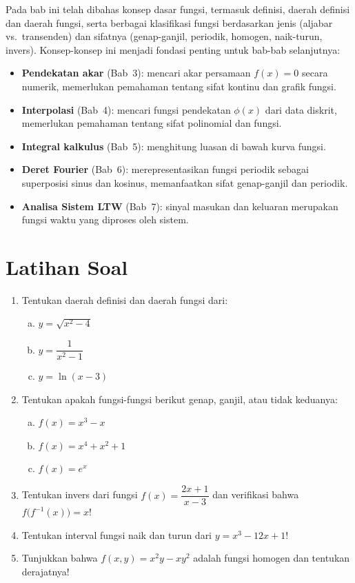 Pada bab ini telah dibahas konsep dasar fungsi, termasuk definisi, daerah definisi dan daerah fungsi, serta berbagai klasifikasi fungsi berdasarkan jenis (aljabar vs.\ transenden) dan sifatnya (genap-ganjil, periodik, homogen, naik-turun, invers). Konsep-konsep ini menjadi fondasi penting untuk bab-bab selanjutnya:
\begin{itemize}
\item \textbf{Pendekatan akar} (Bab~3): mencari akar persamaan $f(x) = 0$ secara numerik, memerlukan pemahaman tentang sifat kontinu dan grafik fungsi.
\item \textbf{Interpolasi} (Bab~4): mencari fungsi pendekatan $\phi(x)$ dari data diskrit, memerlukan pemahaman tentang sifat polinomial dan fungsi.
\item \textbf{Integral kalkulus} (Bab~5): menghitung luasan di bawah kurva fungsi.
\item \textbf{Deret Fourier} (Bab~6): merepresentasikan fungsi periodik sebagai superposisi sinus dan kosinus, memanfaatkan sifat genap-ganjil dan periodik.
\item \textbf{Analisa Sistem LTW} (Bab~7): sinyal masukan dan keluaran merupakan fungsi waktu yang diproses oleh sistem.
\end{itemize}

\section*{Latihan Soal}

\begin{enumerate}
  \item Tentukan daerah definisi dan daerah fungsi dari:
  \begin{enumerate}[(a)]
    \item $y = \sqrt{x^2 - 4}$
    \item $y = \dfrac{1}{x^2 - 1}$
    \item $y = \ln(x - 3)$
  \end{enumerate}
  \item Tentukan apakah fungsi-fungsi berikut genap, ganjil, atau tidak keduanya:
  \begin{enumerate}[(a)]
    \item $f(x) = x^3 - x$
    \item $f(x) = x^4 + x^2 + 1$
    \item $f(x) = e^x$
  \end{enumerate}
  \item Tentukan invers dari fungsi $f(x) = \dfrac{2x+1}{x-3}$ dan verifikasi bahwa $f\bigl(f^{-1}(x)\bigr) = x$!
  \item Tentukan interval fungsi naik dan turun dari $y = x^3 - 12x + 1$!
  \item Tunjukkan bahwa $f(x,y) = x^2 y - xy^2$ adalah fungsi homogen dan tentukan derajatnya!
\end{enumerate}

